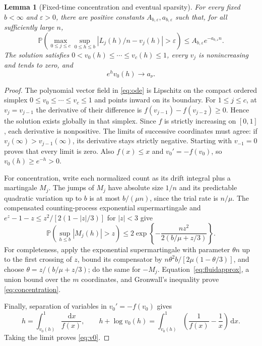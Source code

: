 \documentclass[11pt]{article}
\newtheorem{lemma}[theorem]{Lemma}
\theoremstyle{remark}\newtheorem{remark}[theorem]{Remark}
\newcommand{\Pbb}{\mathbb P}
\newcommand{\dd}{\,\mathrm d}
\begin{document}
\begin{lemma}[Fixed-time concentration and eventual sparsity]\label{lem:fluid}
For every fixed $b<\infty$ and $\varepsilon>0$, there are positive constants
$A_{b,\varepsilon},a_{b,\varepsilon}$ such that, for all sufficiently large $n$,
\begin{equation}\label{eq:concentration}
 \Pbb\left(\max_{0\le j\le c}\sup_{0\le h\le b}
       |L_j(h)/n-v_j(h)|>\varepsilon\right)
 \le A_{b,\varepsilon}e^{-a_{b,\varepsilon}n}.
\end{equation}
The solution satisfies $0<v_0(h)\le\cdots\le v_c(h)\le1$, every $v_j$
is nonincreasing and tends to zero, and
\begin{equation}\label{eq:v0}
 e^h v_0(h)\longrightarrow a_\nu.
\end{equation}
\end{lemma}
\begin{proof}
The polynomial vector field in \eqref{eq:ode} is Lipschitz on the compact
ordered simplex $0\le v_0\le\cdots\le v_c\le1$ and points inward on its
boundary. For $1\le j\le c$, at $v_j=v_{j-1}$ the derivative of their difference
is $f(v_{j-1})-f(v_{j-2})\ge0$. Hence the solution exists globally in that
simplex. Since $f$ is strictly increasing on $[0,1]$, each derivative is
nonpositive. The limits of successive coordinates must agree: if
$v_j(\infty)>v_{j-1}(\infty)$, its derivative stays strictly negative.
Starting with $v_{-1}=0$ proves that every limit is zero. Also $f(x)\le x$
and $v_0'=-f(v_0)$, so $v_0(h)\ge e^{-h}>0$.

For concentration, write each normalized count as its drift integral plus
a martingale $M_j$. The jumps of $M_j$ have absolute size $1/n$ and its
predictable quadratic variation up to $b$ is at most $b/(\mu n)$, since the
trial rate is $n/\mu$. The compensated counting-process exponential
supermartingale and $e^z-1-z\le z^2/[2(1-|z|/3)]$ for $|z|<3$ give
\[
 \Pbb\left(\sup_{h\le b}|M_j(h)|>z\right)
 \le2\exp\left\{-\frac{nz^2}{2(b/\mu+z/3)}\right\}.
\]
For completeness, apply the exponential supermartingale with parameter
$\theta n$ up to the first crossing of $z$, bound its compensator by
$n\theta^2b/[2\mu(1-\theta/3)]$, and choose
$\theta=z/(b/\mu+z/3)$; do the same for $-M_j$.
Equation~\eqref{eq:fluidapprox}, a union bound over the $m$ coordinates,
and Gronwall's inequality prove \eqref{eq:concentration}.

Finally, separation of variables in $v_0'=-f(v_0)$ gives
\[
 h=\int_{v_0(h)}^1\frac{\dd x}{f(x)},\qquad
 h+\log v_0(h)=\int_{v_0(h)}^1
       \left(\frac1{f(x)}-\frac1x\right)\dd x.
\]
Taking the limit proves \eqref{eq:v0}.
\end{proof}
\end{document}
